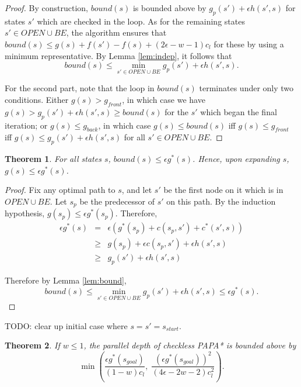 \documentclass[letterpaper]{article}
\newtheorem{thm}{Theorem}
\begin{document}
\begin{proof}
By construction, $bound(s)$ is bounded above by $g_p(s') + \epsilon h(s',s)$ for states $s'$ which are checked in the loop. As for the remaining states $s' \in OPEN \cup BE$, the algorithm ensures that $bound(s) \le g(s) + f(s') - f(s) + (2\epsilon-w-1) c_l$ for these by using a minimum representative. By Lemma \ref{lem:indep}, it follows that
\[bound(s) \le \min_{s' \in OPEN \cup BE} g_p(s') + \epsilon h(s',s).\]

For the second part, note that the loop in $bound(s)$ terminates under only two conditions. Either $g(s) > g_{front}$, in which case we have $g(s) > g_p(s') + \epsilon h(s',s) \ge bound(s)$ for the $s'$ which began the final iteration; or $g(s) \le g_{back}$, in which case $g(s) \le bound(s)$ iff $g(s) \le g_{front}$ iff $g(s) \le g_p(s') + \epsilon h(s',s)$ for all $s' \in OPEN \cup BE$.
\end{proof}

\begin{thm}
\label{thm:subopt}
For all states $s$, $bound(s) \le \epsilon g^*(s)$. Hence, upon expanding $s$, $g(s) \le \epsilon g^*(s)$.
\end{thm}

\begin{proof}
Fix any optimal path to $s$, and let $s'$ be the first node on it which is in $OPEN \cup BE$. Let $s_p$ be the predecessor of $s'$ on this path. By the induction hypothesis, $g(s_p) \le \epsilon g^*(s_p)$. Therefore,
\begin{eqnarray*}
\epsilon g^*(s)&=& \epsilon\left(g^*(s_p) + c(s_p,s') + c^*(s',s)\right)
\\&\ge& g(s_p) + \epsilon c(s_p,s') + \epsilon h(s',s)
\\&\ge& g_p(s') + \epsilon h(s',s)
\end{eqnarray*}

Therefore by Lemma \ref{lem:bound},
\[bound(s) \le \min_{s' \in OPEN \cup BE} g_p(s') + \epsilon h(s',s) \le \epsilon g^*(s).\]
\end{proof}

TODO: clear up initial case where $s = s' = s_{start}$.

\begin{thm}
\label{thm:depth}
If $w \le 1$, the parallel depth of checkless PAPA* is bounded above by
\[\min\left(\frac{\epsilon g^*(s_{goal})}{(1-w)c_l},\;
\frac{\left(\epsilon g^*(s_{goal})\right)^2 }{(4\epsilon-2w-2)c_l^2}\right).\]
\end{thm}
\end{document}
